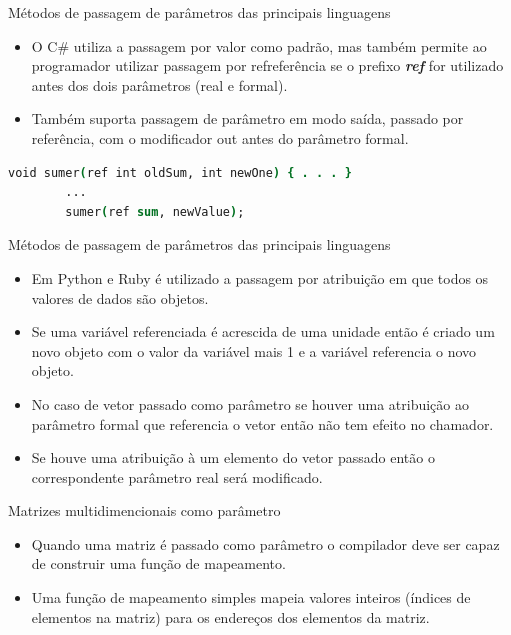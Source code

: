 \begin{frame}[fragile]{Métodos de passagem de parâmetros das principais linguagens}
	\begin{itemize}
	  \item O C\# utiliza a passagem por valor como padrão, mas também permite ao programador utilizar passagem por refreferência se o prefixo \textbf{\emph{ref}} for utilizado antes dos dois parâmetros (real e formal).
	  \item Também suporta passagem de parâmetro em modo saída, passado por referência, com o modificador out antes do parâmetro formal.
	\end{itemize}
	\begin{lstlisting}[language=csh]
		void sumer(ref int oldSum, int newOne) { . . . }
		...
		sumer(ref sum, newValue);
	\end{lstlisting}	
\end{frame}
 
\begin{frame}[fragile]{Métodos de passagem de parâmetros das principais linguagens}
	\begin{itemize}
	  \item Em Python e Ruby é utilizado a passagem por atribuição em que todos os valores de dados são objetos.
	  \item Se uma variável referenciada é acrescida de uma unidade então é criado um novo objeto com o valor da variável mais 1 e a variável referencia o novo objeto.
	  \item  No caso de vetor passado como parâmetro se houver uma atribuição ao parâmetro formal que referencia o vetor então não tem efeito no chamador.
	  \item Se houve uma atribuição à um elemento do vetor passado então o correspondente parâmetro real será modificado.
	\end{itemize}
\end{frame}

\begin{frame}[fragile]{Matrizes multidimencionais como parâmetro}
	\begin{itemize}
	  \item Quando uma matriz é passado como parâmetro o compilador deve ser capaz de construir uma função de mapeamento. 
	  \item Uma função de mapeamento simples mapeia valores inteiros (índices de elementos na matriz) para os endereços dos elementos da matriz.
	\end{itemize}
\end{frame}


